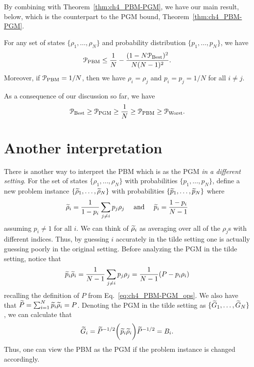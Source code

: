 By combining with Theorem~\ref{thm:ch4_PBM-PGM}, we have our main result, below, which is the counterpart to the PGM bound, Theorem~\ref{thm:ch4_PBM-PGM}. 

\begin{theorem} \label{thm:ch4_PBM-PBM}
For any set of states $\{ \rho_1, \ldots, \rho_N \}$ and probability distribution $\{ p_1, \ldots, p_N \}$, we have 
\begin{equation} 
\mathcal{P}_{\mathrm{PBM}} \leq \frac{1}{N} - \frac{(1 - N \mathcal{P}_{\mathrm{Best}})^2}{N (N - 1)^2}. 
\end{equation} 
Moreover, if $\mathcal{P}_{\mathrm{PBM}} = 1/N$, then we have $\rho_i = \rho_j$ and $p_i = p_j = 1/N$ for all $i \neq j$. 
\end{theorem} 

As a consequence of our discussion so far, we have 
\begin{equation}
\mathcal{P}_{\mathrm{Best}} \geq \mathcal{P}_{\mathrm{PGM}} \geq \frac{1}{N} \geq \mathcal{P}_{\mathrm{PBM}} \geq \mathcal{P}_{\mathrm{Worst}}.
\label{eq:ch4_PBM-AllInequalities}
\end{equation} 

\section{Another interpretation} \label{sec:ch4_PBM-interpret}

There is another way to interpret the PBM which is as the PGM \emph{in a different setting}.  
For the set of states 
$\{ \rho_1, \ldots, \rho_N \}$ with probabilities 
$\{ p_1, \ldots, p_N \}$, define a new problem instance 
$\{ \widetilde{\rho}_1, \ldots, \widetilde{\rho}_N \}$ with probabilities 
$\{ \widetilde{p}_1, \ldots, \widetilde{p}_N \}$ 
where 
\begin{equation} 
\widetilde{\rho}_i 
= \frac{1}{1-p_i} \sum_{j \neq i} p_j \rho_j 
\quad \text{ and } \quad
\widetilde{p}_i 
= \frac{1-p_i}{N-1} 
\end{equation} 
assuming $p_i \neq 1$ for all $i$. 
We can think of $\widetilde{\rho}_i$ as averaging over all of the $\rho_j$s with different indices. 
Thus, by guessing $i$ accurately in the tilde setting one is actually guessing poorly in the original setting.  
Before analyzing the PGM in the tilde setting, notice that 
\begin{equation}
\widetilde{p}_i \widetilde{\rho}_i 
= \frac{1}{N-1} \sum_{j \neq i} p_j \rho_j 
= \frac{1}{N-1} (P - p_i \rho_i)  
\end{equation}
recalling the definition of $P$ from Eq.~\eqref{eq:ch4_PBM-PGM_ops}. 
We also have that 
$\widetilde{P} 
= \sum_{i=1}^N \widetilde{p}_i \widetilde{\rho}_i 
= P$.   
Denoting the PGM in the tilde setting as $\{ \widetilde{G}_1, \ldots, \widetilde{G}_N \}$, we can calculate that   
\begin{equation*} 
\widetilde{G}_i 
= \widetilde{P}^{-1/2} \bigg( \widetilde{p}_i \widetilde{\rho}_i \bigg) \widetilde{P}^{-1/2}   
= B_i. 
\end{equation*}
Thus, one can view the PBM as the PGM if the problem instance is changed accordingly.  

